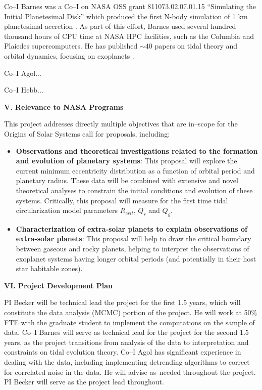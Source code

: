 Co--I Barnes was a Co--I on NASA OSS grant 811073.02.07.01.15
``Simulating the Initial Planetesimal Disk'' which produced the first
N-body simulation of 1 km planetesimal accretion
\citep{Barnes09_1km}. As part of this effort, Barnes used several hundred thousand hours of CPU time at NASA HPC facilities, such as the Columbia and Plaiedes supercomputers. He has published $\sim 40$ papers on tidal theory and orbital dynamics, focusing on exoplanets
\citep[e.g.][]{BarnesQuinn01,BarnesRaymond04,BarnesGreenberg06a,Barnes11,Barnes13}. 

Co--I Agol...

Co--I Hebb...

\bigskip
\centerline{\bf V. Relevance to NASA Programs}
\smallskip

This project addresses directly multiple objectives that are in--scope
for the Origins of Solar Systems call for proposals, including:
\begin{itemize}

\item {\bf Observations and theoretical investigations related to the formation 
  and evolution of planetary systems}: This proposal will explore the
  current minimum eccentricity distribution as a function of orbital
  period and planetary radius.  These data will be combined with
  extensive and novel theoretical analyses to constrain the initial
  conditions and evolution of these systems.  Critically, this
  proposal will measure for the first time tidal circularization model
  parameters $R_{crit}$, $Q_{r}$ and $Q_{g}$.

\item {\bf Characterization of extra-solar planets to explain
  observations of extra-solar planets}: This proposal will help to
  draw the critical boundary between gaseous and rocky planets,
  helping to interpret the observations of exoplanet systems having
  longer orbital periods (and potentially in their host star habitable
  zones).

\end{itemize}



\bigskip
\centerline{\bf VI. Project Development Plan}
\smallskip

PI Becker will be technical lead the project for the first 1.5 years,
which will constitute the data analysis (MCMC) portion of the project.
He will work at 50\% FTE with the graduate student to implement the
computations on the \kepler sample of data.  Co--I Barnes will serve as
technical lead for the project for the second 1.5 years, as the
project transitions from analysis of the data to interpretation and
constraints on tidal evolution theory.  Co--I Agol has significant
experience in dealing with the \kepler data, including implementing
detrending algorithms to correct for correlated noise in the \kepler
data.  He will advise as--needed throughout the project.  PI Becker
will serve as the project lead throughout.

